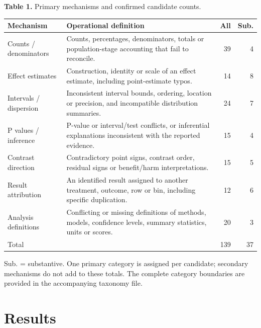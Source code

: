 \documentclass[11pt,a4paper]{article}
\begin{document}
\begin{center}\begin{minipage}{\linewidth}\small
\textbf{Table 1.} Primary mechanisms and confirmed candidate counts.\par\smallskip
\begin{tabularx}{\linewidth}{@{}p{.22\linewidth}Xrr@{}}
\toprule
Mechanism & Operational definition & All & Sub. \\
\midrule
Counts / denominators & Counts, percentages, denominators, totals or population-stage accounting that fail to reconcile. & 39 & 4 \\
Effect estimates & Construction, identity or scale of an effect estimate, including point-estimate typos. & 14 & 8 \\
Intervals / dispersion & Inconsistent interval bounds, ordering, location or precision, and incompatible distribution summaries. & 24 & 7 \\
P values / inference & P-value or interval/test conflicts, or inferential explanations inconsistent with the reported evidence. & 15 & 4 \\
Contrast direction & Contradictory point signs, contrast order, residual signs or benefit/harm interpretations. & 15 & 5 \\
Result attribution & An identified result assigned to another treatment, outcome, row or bin, including specific duplication. & 12 & 6 \\
Analysis definitions & Conflicting or missing definitions of methods, models, confidence levels, summary statistics, units or scores. & 20 & 3 \\
\midrule
Total &  & 139 & 37 \\
\bottomrule\end{tabularx}
\par\smallskip\footnotesize Sub. = substantive. One primary category is assigned per candidate; secondary mechanisms do not add to these totals. The complete category boundaries are provided in the accompanying taxonomy file.
\end{minipage}\end{center}
\section{Results}
\end{document}
